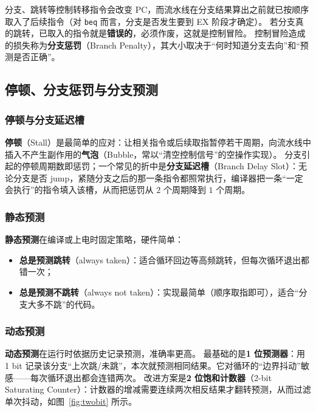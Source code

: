 分支、跳转等控制转移指令会改变 PC，而流水线在分支结果算出之前就已按顺序取入了后续指令（对 \texttt{beq} 而言，分支是否发生要到 EX 阶段才确定）。
若分支真的跳转，已取入的指令就是\textbf{错误的}，必须作废，这就是控制冒险。
控制冒险造成的损失称为\textbf{分支惩罚}（Branch Penalty），其大小取决于“何时知道分支去向”和“预测是否正确”。

\subsection{停顿、分支惩罚与分支预测}
\label{sec:stall}

\subsubsection{停顿与分支延迟槽}

\textbf{停顿}（Stall）是最简单的应对：让相关指令或后续取指暂停若干周期，向流水线中插入不产生副作用的\textbf{气泡}（Bubble，常以“清空控制信号”的空操作实现）。
分支引起的停顿周期数即惩罚；一个常见的折中是\textbf{分支延迟槽}（Branch Delay Slot）：无论分支是否 jump，紧随分支之后的那一条指令都照常执行，编译器把一条“一定会执行”的指令填入该槽，从而把惩罚从 $2$ 个周期降到 $1$ 个周期。

\subsubsection{静态预测}

\textbf{静态预测}在编译或上电时固定策略，硬件简单：
\begin{itemize}
    \item \textbf{总是预测跳转}（always taken）：适合循环回边等高频跳转，但每次循环退出都错一次；
    \item \textbf{总是预测不跳转}（always not taken）：实现最简单（顺序取指即可），适合“分支大多不跳”的代码。
\end{itemize}

\subsubsection{动态预测}

\textbf{动态预测}在运行时依据历史记录预测，准确率更高。
最基础的是\textbf{1 位预测器}：用 1 bit 记录该分支“上次跳/未跳”，本次就预测相同结果。它对循环的“边界抖动”敏感——每次循环退出都会连错两次。
改进方案是\textbf{2 位饱和计数器}（2-bit Saturating Counter）：计数器的增减需要连续两次相反结果才翻转预测，从而过滤单次抖动，如图~\ref{fig:twobit} 所示。

